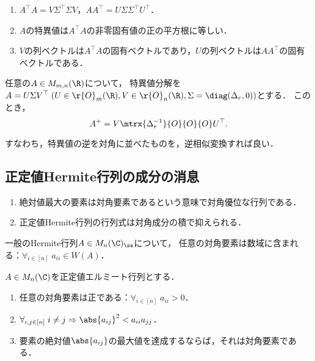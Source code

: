 \documentclass[uplatex, dvipdfmx]{jsreport}
\begin{document}
\begin{corollary}\mbox{}
    \begin{enumerate}
        \item $A^\top A=V\Sigma^\top\Sigma V$，$AA^\top=U\Sigma\Sigma^\top U^\top$．
        \item $A$の特異値は$A^\top A$の非零固有値の正の平方根に等しい．
        \item $V$の列ベクトルは$A^\top A$の固有ベクトルであり，$U$の列ベクトルは$AA^\top$の固有ベクトルである．
    \end{enumerate}
\end{corollary}

\begin{theorem}
    任意の$A\in M_{m,n}(\R)$について，
    特異値分解を$A=U\Sigma V^\top\;(U\in\r{O}_m(\R),V\in\r{O}_n(\R),\Sigma=\diag(\Delta_r,0))$とする．
    このとき，
    \[A^+=V\mtrx{\Delta_r^{-1}}{O}{O}{O}U^\top.\]
\end{theorem}
\begin{remarks}
    すなわち，特異値の逆を対角に並べたものを，逆相似変換すれば良い．
\end{remarks}

\subsection{正定値Hermite行列の成分の消息}

\begin{tcolorbox}[colframe=ForestGreen, colback=ForestGreen!10!white,breakable,colbacktitle=ForestGreen!40!white,coltitle=black,fonttitle=\bfseries\sffamily,
title=]
    \begin{enumerate}
        \item 絶対値最大の要素は対角要素であるという意味で対角優位な行列である．
        \item 正定値Hermite行列の行列式は対角成分の積で抑えられる．
    \end{enumerate}
\end{tcolorbox}

\begin{theorem}
    一般のHermite行列$A\in M_n(\C)_\sa$について，
    任意の対角要素は数域に含まれる：$\forall_{i\in[n]}\;a_{ii}\in W(A)$．
\end{theorem}

\begin{proposition}
    $A\in M_n(\C)$を正定値エルミート行列とする．
    \begin{enumerate}
        \item 任意の対角要素は正である：$\forall_{i\in[n]}\;a_{ii}>0$．
        \item $\forall_{i,j\in[n]}\;i\ne j\Rightarrow\abs{a_{ij}}^2<a_{ii}a_{jj}$．
        \item 要素の絶対値$\abs{a_{ij}}$の最大値を達成するならば，それは対角要素である．
    \end{enumerate}
\end{proposition}
\end{document}
